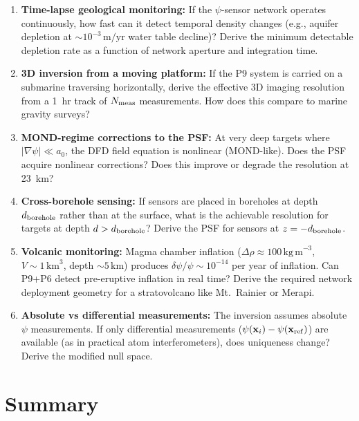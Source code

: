 \documentclass[aps,prd,twocolumn,superscriptaddress,nofootinbib]{revtex4-2}
\newcommand{\drho}{\Delta\rho}
\newcommand{\km}{\,\mathrm{km}}
\begin{document}
\begin{enumerate}
\item \textbf{Time-lapse geological monitoring:} If the $\psi$-sensor
  network operates continuously, how fast can it detect temporal
  density changes (e.g., aquifer depletion at $\sim 10^{-3}\,\mathrm{m/yr}$
  water table decline)?  Derive the minimum detectable depletion
  rate as a function of network aperture and integration time.

\item \textbf{3D inversion from a moving platform:} If the P9 system
  is carried on a submarine traversing horizontally, derive the
  effective 3D imaging resolution from a 1~hr track of $N_{\rm meas}$
  measurements.  How does this compare to marine gravity surveys?

\item \textbf{MOND-regime corrections to the PSF:} At very deep targets
  where $|\nabla\psi| \ll a_0$, the DFD field equation is nonlinear
  (MOND-like).  Does the PSF acquire nonlinear corrections?  Does
  this improve or degrade the resolution at 23~km?

\item \textbf{Cross-borehole sensing:} If sensors are placed in
  boreholes at depth $d_{\rm borehole}$ rather than at the surface,
  what is the achievable resolution for targets at depth $d > d_{\rm borehole}$?
  Derive the PSF for sensors at $z = -d_{\rm borehole}$.

\item \textbf{Volcanic monitoring:} Magma chamber inflation
  ($\drho \approx 100\,\mathrm{kg\,m}^{-3}$, $V \sim 1\,\mathrm{km}^3$,
  depth $\sim 5\km$) produces $\delta\psi/\psi \sim 10^{-14}$
  per year of inflation.  Can P9+P6 detect pre-eruptive inflation
  in real time?  Derive the required network deployment geometry
  for a stratovolcano like Mt.~Rainier or Merapi.

\item \textbf{Absolute vs differential measurements:} The inversion
  assumes absolute $\psi$ measurements.  If only differential
  measurements ($\psi(\mathbf{x}_i) - \psi(\mathbf{x}_{\rm ref})$)
  are available (as in practical atom interferometers), does
  uniqueness change?  Derive the modified null space.
\end{enumerate}

\section{Summary}
\label{sec:summary}
\end{document}
